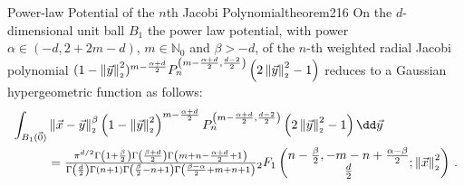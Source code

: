 \begin{theorem}{Power-law Potential of the $n$th Jacobi Polynomial}{theorem216}
  On the $d$-dimensional unit ball $B_1$ the power law potential, with power $\alpha \in(-d,2+2m-d)$, $m\in\mathbb{N}_0$ and $\beta>-d$, of the $n$-th weighted radial Jacobi polynomial $(1-\left\lVert\vec{y}\right\rVert_{\scriptscriptstyle 2}^2)^{m-\frac{\alpha+d}{2}}P_n^{\left(m-\frac{\alpha+d}{2},\frac{d-2}{2}\right)}\left(2 \left\lVert\vec{y}\right\rVert_{\scriptscriptstyle 2}^2 - 1\right)$ reduces to a Gaussian hypergeometric function as follows:
  \begin{align*}
    \int_{B_1(\vec{0})} & \norm{\vec{x}-\vec{y}}^\beta \left(1-\norm{\vec{y}}^2\right)^{m-\frac{\alpha+d}{2}} P_{n}^{\left(m-\frac{\alpha+d}{2},\frac{d-2}{2}\right)}\left(\jacobiarg{y}\right) \dd\vec{y}                                                                                                                                                                                                                                   \\
                        & = \tfrac{\pi ^{d/2} \Gamma \left(1+\frac{\beta}{2}\right) \Gamma \left(\frac{\beta+d}{2}\right) \Gamma \left(m+n-\frac{\alpha+d}{2}+1\right)}{\Gamma \left(\frac{d}{2}\right) \Gamma (n+1) \Gamma \left(\frac{\beta}{2}-n+1\right) \Gamma \left(\frac{\beta-\alpha}{2}+m+n+1\right)}{}_2F_1\left(\begin{matrix}n-\frac{\beta}{2}, -m-n+\frac{\alpha-\beta}{2} \\\frac{d}{2}\end{matrix};\norm{\vec{x}}^2\right)\,.
  \end{align*}
\end{theorem}

